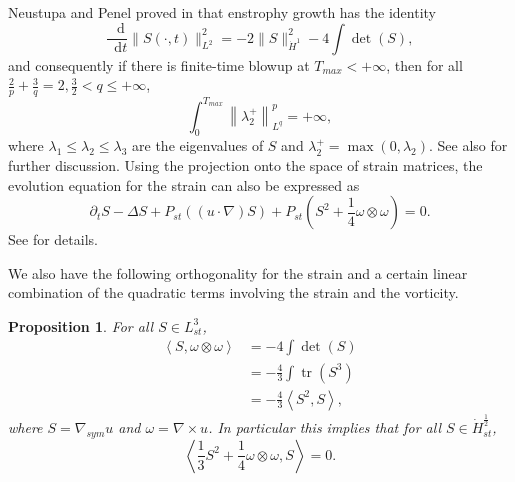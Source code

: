 \documentclass[11pt]{article}
\theoremstyle{plain}
\newtheorem{proposition}[theorem]{Proposition}
\theoremstyle{remark}
\numberwithin{equation}{section}
\newcommand{\diff}{\mathop{}\!\mathrm{d}}
\DeclareMathOperator*{\tr}{tr}
\begin{document}
Neustupa and Penel proved in \cite{NeuPen1} that enstrophy growth has the identity
\begin{equation} \label{EntGrowth}
    \frac{\diff}{\diff t}
    \|S(\cdot,t)\|_{L^2}^2=
    -2\|S\|_{\dot{H}^1}^2-4\int\det(S),
\end{equation}
and consequently if there is finite-time blowup at $T_{max}<+\infty$, then for all 
$\frac{2}{p}+\frac{3}{q}=2, \frac{3}{2}<q\leq+\infty$,
\begin{equation}
\int_0^{T_{max}}\left\|\lambda_2^+\right\|_{L^q}^p=+\infty,
\end{equation}
where $\lambda_1\leq \lambda_2 \leq \lambda_3$ are the eigenvalues of $S$ and $\lambda_2^+=\max(0,\lambda_2)$.
See also \cites{NeuPen2,MillerStrain} for further discussion.
Using the projection onto the space of strain matrices, the evolution equation for the strain can also be expressed as
\begin{equation} \label{NSstrain}
    \partial_t S-\Delta S+P_{st}\left(
    (u\cdot \nabla)S\right)
    +P_{st}\left(S^2
    +\frac{1}{4}\omega\otimes\omega \right)=0.
\end{equation}
See \cites{MillerStrain,MillerStrainModel} for details.

We also have the following orthogonality for the strain and a certain linear combination of the quadratic terms involving the strain and the vorticity.
\begin{proposition} \label{ThirdOrderIdentity}
For all $S\in L^3_{st}$,
\begin{align}
    \left<S,\omega\otimes\omega\right>
    &=
    -4\int\det(S) \\
    &=-\frac{4}{3}\int\tr\left(S^3\right) \\
    &=-\frac{4}{3}\left<S^2,S\right>,
\end{align}
where $S=\nabla_{sym} u$ and $\omega=\nabla\times u$.
In particular this implies that for all 
$S\in \dot{H}^\frac{1}{2}_{st}$,
\begin{equation}
    \left<\frac{1}{3}S^2
    +\frac{1}{4}\omega\otimes\omega,
    S\right>=0.
\end{equation}
\end{proposition}
\end{document}
